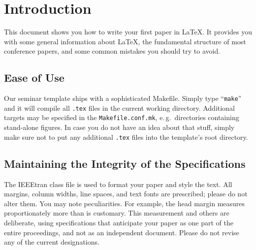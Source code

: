 \section{Introduction}
This document shows you how to write your first paper in \LaTeX{}.
It provides you with some general information about \LaTeX{}, the fundamental
structure of most conference papers, and some common mistakes you should try to
avoid.

\subsection{Ease of Use}
Our seminar template ships with a sophisticated Makefile.
Simply type ``\texttt{make}'' and it will compile all \texttt{.tex} files in
the current working directory.
Additional targets may be specified in the \texttt{Makefile.conf.mk}, e.\,g.\
directories containing stand-alone figures.
In case you do not have an idea about that stuff, simply make sure not to put
any additional \texttt{.tex} files into the template's root directory.


\subsection{Maintaining the Integrity of the Specifications}
The IEEEtran class file is used to format your paper and style the text. All margins, 
column widths, line spaces, and text fonts are prescribed; please do not 
alter them. You may note peculiarities. For example, the head margin
measures proportionately more than is customary. This measurement 
and others are deliberate, using specifications that anticipate your paper 
as one part of the entire proceedings, and not as an independent document. 
Please do not revise any of the current designations.

